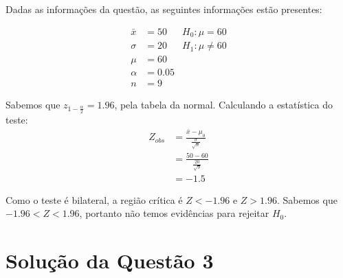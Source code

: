 \documentclass[
	12pt,				%
	openright,			%
	oneside,			%
	a4paper,			%
	english,			%
	brazil,				%
	]{abntex2}
\begin{document}
Dadas as informações da questão, as seguintes informações estão presentes:

\begin{align*}
    \bar{x} &= 50 &H_{0}: \mu = 60\\
    \sigma &= 20 &H_{1}: \mu \neq 60\\
    \mu &= 60\\
    \alpha &= 0.05\\
    n &= 9
\end{align*}

Sabemos que $z_{1 - \frac{\alpha}{2}} = 1.96$, pela tabela da normal. Calculando a estatística do teste:
\begin{align*}
Z_{obs} &= \frac{\bar{x} - \mu_{0}}{\frac{\sigma}{\sqrt{n}}}\\
&= \frac{50 - 60}{\frac{20}{\sqrt{9}}}\\
&= -1.5
\end{align*}

Como o teste é bilateral, a região crítica é $Z < -1.96$ e $Z > 1.96$. Sabemos que $-1.96 < Z < 1.96$, portanto não temos evidências para rejeitar $H_{0}$.

\section{Solução da Questão 3}
\end{document}
